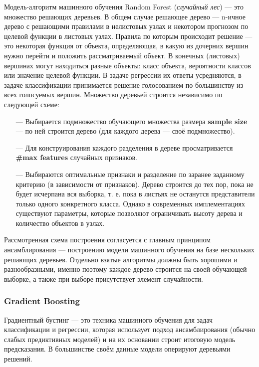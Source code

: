 \documentclass[14pt]{extarticle}
\begin{document}
Модель-алгоритм машинного обучения Random Forest ({\it случайный лес}) --- это множество решающих деревьев. В общем случае решающее дерево --- n-ичное дерево с решающими правилами в нелистовых узлах и некотором прогнозом по целевой функции в листовых узлах. Правила по которым происходит решение --- это некоторая функция от объекта, определяющая, в какую из дочерних вершин нужно перейти и положить рассматриваемый объект. В конечных (листовых) вершинах могут находиться разные объекты: класс объекта, вероятности классов или значение целевой функции. В задаче регрессии их ответы усредняются, в задаче классификации принимается решение голосованием по большинству из всех голосуемых вершин. Множество деревьей строится независимо по следующей схеме:

\begin{itemize}
	\linespread{2}
	\item[---] Выбирается подмножество обучающего множества размера {\bf sample size} --- по ней строится дерево (для каждого дерева --- своё подмножество).
	\item[---] Для конструирования каждого разделения в дереве просматривается {\bf \#max features} случайных признаков.
	\item[---] Выбираются оптимальные признаки и разделение по заранее заданному критерию (в зависимости от признаков). Дерево строится до тех пор, пока не будет исчерпана вся выборка, т. е. пока в листьях не останутся представители только одного конкретного класса. Однако в современных имплементациях существуют параметры, которые позволяют ограничивать высоту дерева и количество объектов в узлах.
\end{itemize}

Рассмотренная схема построения согласуется с главным принципом ансамблирования --- построению модели машинного обучения на базе нескольких решающих деревьев. Отдельно взятые алгоритмы должны быть хорошими и разнообразными, именно поэтому каждое дерево строится на своей обучающей выборке, а также при выборе присутствует элемент случайности.


\subsubsection{Gradient Boosting}

Градиентный бустинг --- это техника машинного обучения для задач классификации и регрессии, которая использует подход ансамблирования (обычно слабых предиктивных моделей) и на их основании строит итоговую модель предсказания. В большинстве своём данные модели оперируют деревьями решений.
\end{document}
